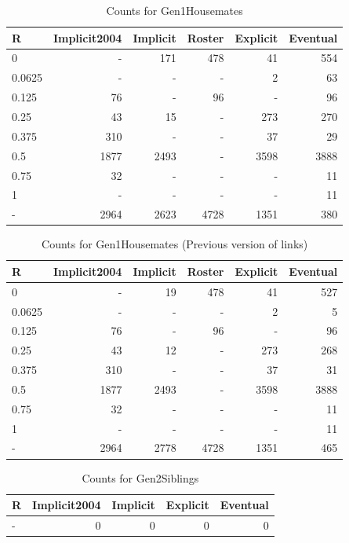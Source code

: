 \documentclass[a4paper]{article}\usepackage{graphicx, color}
\begin{document}
\begin{table}[ht]
\centering
{\large
\begin{tabular}{lrrrrr}
  \hline
R & Implicit2004 & Implicit & Roster & Explicit & Eventual \\ 
  \hline
0 & - & 171 & 478 &  41 & 554 \\ 
  0.0625 & - & - & - &   2 &  63 \\ 
  0.125 &  76 & - &  96 & - &  96 \\ 
  0.25 &  43 &  15 & - & 273 & 270 \\ 
  0.375 & 310 & - & - &  37 &  29 \\ 
  0.5 & 1877 & 2493 & - & 3598 & 3888 \\ 
  0.75 &  32 & - & - & - &  11 \\ 
  1 & - & - & - & - &  11 \\ 
  - & 2964 & 2623 & 4728 & 1351 & 380 \\ 
   \hline
\end{tabular}
}
\caption{Counts for Gen1Housemates} 
\end{table}
\begin{table}[ht]
\centering
{\large
\begin{tabular}{lrrrrr}
  \hline
R & Implicit2004 & Implicit & Roster & Explicit & Eventual \\ 
  \hline
0 & - &  19 & 478 &  41 & 527 \\ 
  0.0625 & - & - & - &   2 &   5 \\ 
  0.125 &  76 & - &  96 & - &  96 \\ 
  0.25 &  43 &  12 & - & 273 & 268 \\ 
  0.375 & 310 & - & - &  37 &  31 \\ 
  0.5 & 1877 & 2493 & - & 3598 & 3888 \\ 
  0.75 &  32 & - & - & - &  11 \\ 
  1 & - & - & - & - &  11 \\ 
  - & 2964 & 2778 & 4728 & 1351 & 465 \\ 
   \hline
\end{tabular}
}
\caption{Counts for Gen1Housemates (Previous version of links)} 
\end{table}
\begin{table}[ht]
\centering
{\large
\begin{tabular}{lrrrr}
  \hline
R & Implicit2004 & Implicit & Explicit & Eventual \\ 
  \hline
- &   0 &   0 &   0 &   0 \\ 
   \hline
\end{tabular}
}
\caption{Counts for Gen2Siblings} 
\end{table}
\end{document}
